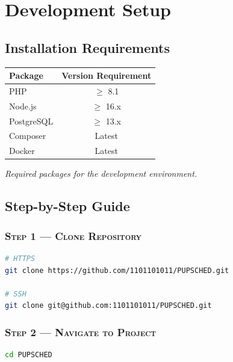 \documentclass[12pt,letterpaper]{article}
\begin{document}
\section{Development Setup}

\subsection*{Installation Requirements}

\begin{center}
\renewcommand{\arraystretch}{1.3} 
\setlength{\tabcolsep}{12pt}    
\begin{tabular}{|l|c|}
\hline
\textbf{Package} & \textbf{Version Requirement} \\
\hline
PHP         & $\geq$ 8.1 \\
Node.js     & $\geq$ 16.x \\
PostgreSQL  & $\geq$ 13.x \\
Composer    & Latest \\
Docker    & Latest \\
\hline
\end{tabular}
\end{center}

\captionsetup{type=table}
\caption{\textit{Required packages for the development environment.}}

\vspace{1.5em} 

\subsection*{Step-by-Step Guide}

\subsubsection*{\textsc{Step 1 — Clone Repository}}
\begin{lstlisting}[language=bash]
# HTTPS
git clone https://github.com/1101101011/PUPSCHED.git

# SSH
git clone git@github.com:1101101011/PUPSCHED.git
\end{lstlisting}

\subsubsection*{\textsc{Step 2 — Navigate to Project}}
\begin{lstlisting}[language=bash]
cd PUPSCHED
\end{lstlisting}
\end{document}
